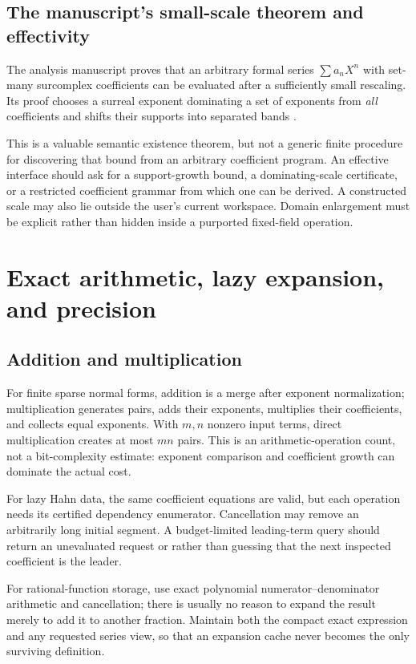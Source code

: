 \documentclass[11pt,letterpaper]{article}
\theoremstyle{definition}
\newcommand{\code}[1]{\texttt{\detokenize{#1}}}
\numberwithin{equation}{section}
\begin{document}
\subsection{The manuscript's small-scale theorem and effectivity}
The analysis manuscript proves that an arbitrary formal series $\sum a_nX^n$ with set-many surcomplex coefficients can be evaluated after a sufficiently small rescaling. Its proof chooses a surreal exponent dominating a set of exponents from \emph{all} coefficients and shifts their supports into separated bands \cite[\S4, theorem ``Evaluation of arbitrary formal series'']{SourceAnalysis}.

This is a valuable semantic existence theorem, but not a generic finite procedure for discovering that bound from an arbitrary coefficient program. An effective interface should ask for a support-growth bound, a dominating-scale certificate, or a restricted coefficient grammar from which one can be derived. A constructed scale may also lie outside the user's current workspace. Domain enlargement must be explicit rather than hidden inside a purported fixed-field operation.

\section{Exact arithmetic, lazy expansion, and precision}\label{sec:arithmetic}
\subsection{Addition and multiplication}
For finite sparse normal forms, addition is a merge after exponent normalization; multiplication generates pairs, adds their exponents, multiplies their coefficients, and collects equal exponents. With $m,n$ nonzero input terms, direct multiplication creates at most $mn$ pairs. This is an arithmetic-operation count, not a bit-complexity estimate: exponent comparison and coefficient growth can dominate the actual cost.

For lazy Hahn data, the same coefficient equations are valid, but each operation needs its certified dependency enumerator. Cancellation may remove an arbitrarily long initial segment. A budget-limited leading-term query should return an unevaluated request or \code{Unknown} rather than guessing that the next inspected coefficient is the leader.

For rational-function storage, use exact polynomial numerator--denominator arithmetic and cancellation; there is usually no reason to expand the result merely to add it to another fraction. Maintain both the compact exact expression and any requested series view, so that an expansion cache never becomes the only surviving definition.
\end{document}
